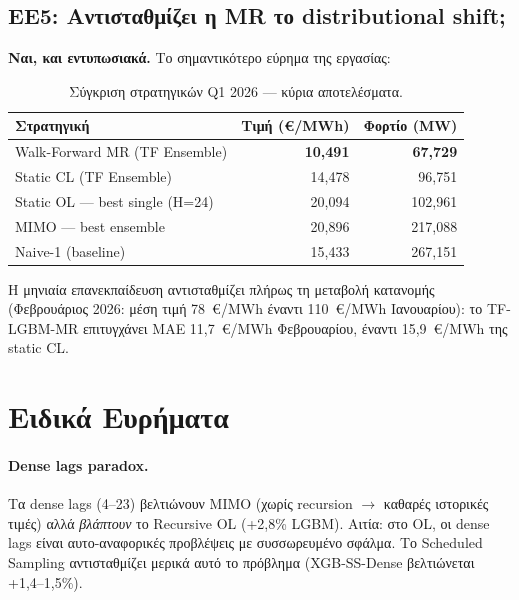 \subsection*{ΕΕ5: Αντισταθμίζει η MR το distributional shift;}

\textbf{Ναι, και εντυπωσιακά.} Το σημαντικότερο εύρημα της εργασίας:

\begin{table}[htbp]
\centering
\caption{Σύγκριση στρατηγικών Q1 2026 — κύρια αποτελέσματα.}
\label{tab:conc_summary}
\begin{tabular}{lrr}
\toprule
\textbf{Στρατηγική} & \textbf{Τιμή (€/MWh)} & \textbf{Φορτίο (MW)} \\
\midrule
Walk-Forward MR (TF Ensemble)     & \textbf{10,491} & \textbf{67,729} \\
Static CL (TF Ensemble)           & 14,478           & 96,751 \\
Static OL — best single (H=24)    & 20,094           & 102,961 \\
MIMO — best ensemble              & 20,896           & 217,088 \\
\midrule
Naive-1 (baseline)                & 15,433           & 267,151 \\
\bottomrule
\end{tabular}
\end{table}

Η μηνιαία επανεκπαίδευση αντισταθμίζει πλήρως τη μεταβολή κατανομής
(Φεβρουάριος 2026: μέση τιμή 78~€/MWh έναντι 110~€/MWh Ιανουαρίου): το
TF-LGBM-MR επιτυγχάνει MAE 11,7~€/MWh Φεβρουαρίου, έναντι 15,9~€/MWh
της static CL.

\section{Ειδικά Ευρήματα}
\label{sec:conc_special}

\paragraph{Dense lags paradox.}
Τα dense lags (4--23) βελτιώνουν MIMO (χωρίς recursion $\to$ καθαρές ιστορικές τιμές)
αλλά \textit{βλάπτουν} το Recursive OL (+2,8\% LGBM). Αιτία: στο OL, οι
dense lags είναι αυτο-αναφορικές προβλέψεις με συσσωρευμένο σφάλμα. Το Scheduled
Sampling αντισταθμίζει μερικά αυτό το πρόβλημα (XGB-SS-Dense βελτιώνεται +1,4--1,5\%).

